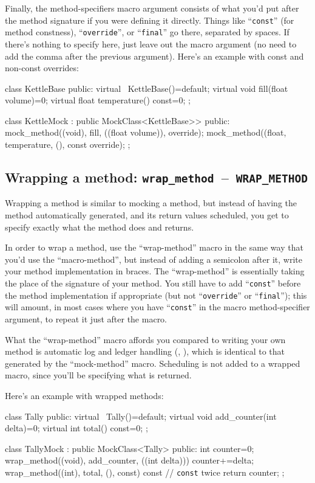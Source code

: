\documentclass[twoside, a4paper, article]{memoir}
\newcommand*\testudocolor{\color{red!80!blue}}
\newcommand*\testudo[1]{\texttt{\testudocolor{}#1}}
\newcommand*\testudopair[2]{\testudo{#1}~--~\testudo{#2}}
\newcommand\subsectiontestudopair[3]{%
  \subsection[#1]{#1: \testudopair{#2}{#3}}}
\begin{document}
Finally, the method-specifiers macro argument consists of what you'd put after
the method signature if you were defining it directly.  Things like
``\texttt{const}'' (for method constness), ``\texttt{override}'', or
``\texttt{final}'' go there, separated by spaces.  If there's nothing to
specify here, just leave out the macro argument (no need to add the comma after
the previous argument).  Here's an example with const and non-const overrides:
\begin{cpplisting}
class KettleBase {
public:
  virtual ~KettleBase()=default;
  virtual void fill(float volume)=0;
  virtual float temperature() const=0;
};

class KettleMock
  : public MockClass<KettleBase>> {
public:
  mock_method((void), fill, ((float volume)), override);
  mock_method((float, temperature, (), const override);
};
\end{cpplisting}


\subsectiontestudopair{Wrapping a method}{wrap\_method}{WRAP\_METHOD}
\label{sec:wrapping-method}

Wrapping a method is similar to mocking a method, but instead of having the
method automatically generated, and its return values scheduled, you get to
specify exactly what the method does and returns.

In order to wrap a method, use the ``wrap-method'' macro in the same way that
you'd use the ``macro-method'', but instead of adding a semicolon after it,
write your method implementation in braces.  The ``wrap-method'' is essentially
taking the place of the signature of your method.  You still have to add
``\texttt{const}'' before the method implementation if appropriate (but not
``\texttt{override}'' or ``\texttt{final}''); this will amount, in most cases
where you have ``\texttt{const}'' in the macro method-specifier argument, to
repeat it just after the macro.

What the ``wrap-method'' macro affords you compared to writing your own method
is automatic log and ledger handling (,
), which is identical to that generated by
the ``mock-method'' macro.  Scheduling is not added to a wrapped macro, since
you'll be specifying what is returned.

Here's an example with wrapped methods:
\begin{cpplisting}
class Tally {
public:
  virtual ~Tally()=default;
  virtual void add_counter(int delta)=0;
  virtual int total() const=0;
};

class TallyMock
  : public MockClass<Tally> {
public:
  int counter=0;
  wrap_method((void), add_counter, ((int delta))) {
    counter+=delta;
  }
  wrap_method((int), total, (), const) const { // \texttt{const} twice
    return counter;
  }
};
\end{cpplisting}
\end{document}
